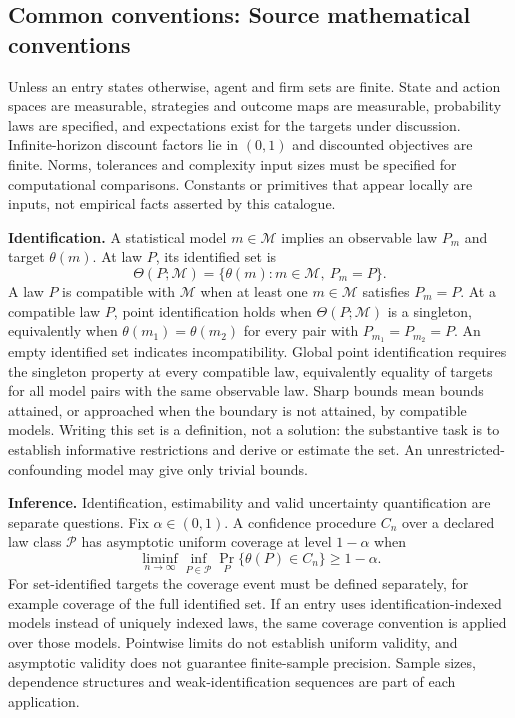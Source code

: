 \documentclass[11pt,a4paper]{article}
\begin{document}
\subsection*{Common conventions: Source mathematical conventions}

Unless an entry states otherwise, agent and firm sets are finite. State and action spaces are measurable, strategies and outcome maps are measurable, probability laws are specified, and expectations exist for the targets under discussion. Infinite-horizon discount factors lie in $(0,1)$ and discounted objectives are finite. Norms, tolerances and complexity input sizes must be specified for computational comparisons. Constants or primitives that appear locally are inputs, not empirical facts asserted by this catalogue.

\textbf{Identification.} A statistical model $m\in\mathcal M$ implies an observable law $P_m$ and target $\theta(m)$. At law $P$, its identified set is
\[
\Theta(P;\mathcal M)=\{\theta(m):m\in\mathcal M,\ P_m=P\}.
\]
A law $P$ is compatible with $\mathcal M$ when at least one $m\in\mathcal M$ satisfies $P_m=P$. At a compatible law $P$, point identification holds when $\Theta(P;\mathcal M)$ is a singleton, equivalently when $\theta(m_1)=\theta(m_2)$ for every pair with $P_{m_1}=P_{m_2}=P$. An empty identified set indicates incompatibility. Global point identification requires the singleton property at every compatible law, equivalently equality of targets for all model pairs with the same observable law. Sharp bounds mean bounds attained, or approached when the boundary is not attained, by compatible models. Writing this set is a definition, not a solution: the substantive task is to establish informative restrictions and derive or estimate the set. An unrestricted-confounding model may give only trivial bounds.

\textbf{Inference.} Identification, estimability and valid uncertainty quantification are separate questions. Fix $\alpha\in(0,1)$. A confidence procedure $C_n$ over a declared law class $\mathcal P$ has asymptotic uniform coverage at level $1-\alpha$ when
\[
\liminf_{n\to\infty}\inf_{P\in\mathcal P}\Pr_P\{\theta(P)\in C_n\}\geq1-\alpha.
\]
For set-identified targets the coverage event must be defined separately, for example coverage of the full identified set. If an entry uses identification-indexed models instead of uniquely indexed laws, the same coverage convention is applied over those models. Pointwise limits do not establish uniform validity, and asymptotic validity does not guarantee finite-sample precision. Sample sizes, dependence structures and weak-identification sequences are part of each application.
\end{document}
